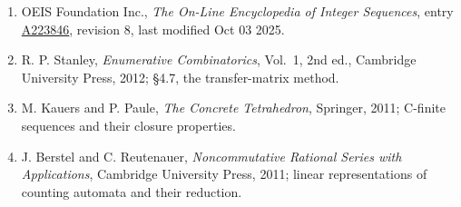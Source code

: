\documentclass[11pt]{article}
\theoremstyle{definition}
\begin{document}
\begin{enumerate}

\item OEIS Foundation Inc., \emph{The On-Line Encyclopedia of Integer Sequences}, entry \href{https://oeis.org/A223846}{A223846}, revision 8, last modified Oct 03 2025.

\item R. P. Stanley, \emph{Enumerative Combinatorics}, Vol.~1, 2nd ed., Cambridge University Press, 2012; \S4.7, the transfer-matrix method.

\item M. Kauers and P. Paule, \emph{The Concrete Tetrahedron}, Springer, 2011; C-finite sequences and their closure properties.

\item J. Berstel and C. Reutenauer, \emph{Noncommutative Rational Series with Applications}, Cambridge University Press, 2011; linear representations of counting automata and their reduction.

\end{enumerate}
\end{document}
